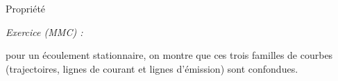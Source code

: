 \begin{frame}{Propriété}

\small
\textcolor{vert}{\sl Exercice (MMC) :}

\medskip

\hspace*{10mm}
\begin{minipage}{100mm}
pour un écoulement stationnaire, on montre que ces trois familles de courbes \\
(trajectoires, lignes de courant et lignes d'émission) sont confondues.
\end{minipage}

\vspace{50mm}

\end{frame}

